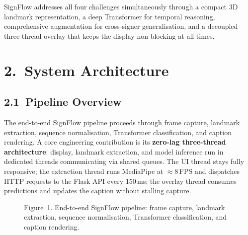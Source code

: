 \documentclass[10pt, twocolumn]{article}
\begin{document}
SignFlow addresses all four challenges simultaneously through a compact 3D landmark representation, a deep Transformer for temporal reasoning, comprehensive augmentation for cross-signer generalisation, and a decoupled three-thread overlay that keeps the display non-blocking at all times.

\section*{2.~System Architecture}

\subsection*{2.1~Pipeline Overview}

The end-to-end SignFlow pipeline proceeds through frame capture, landmark extraction, sequence normalisation, Transformer classification, and caption rendering. A core engineering contribution is its \textbf{zero-lag three-thread architecture}: display, landmark extraction, and model inference run in dedicated threads communicating via shared queues. The UI thread stays fully responsive; the extraction thread runs MediaPipe at $\approx$8\,FPS and dispatches HTTP requests to the Flask API every 150\,ms; the overlay thread consumes predictions and updates the caption without stalling capture.

\begin{figure}[h]
\centering
{}
\caption{Figure~1. End-to-end SignFlow pipeline: frame capture, landmark extraction,
sequence normalisation, Transformer classification, and caption rendering.}
\label{fig:pipeline}
\end{figure}
\end{document}
